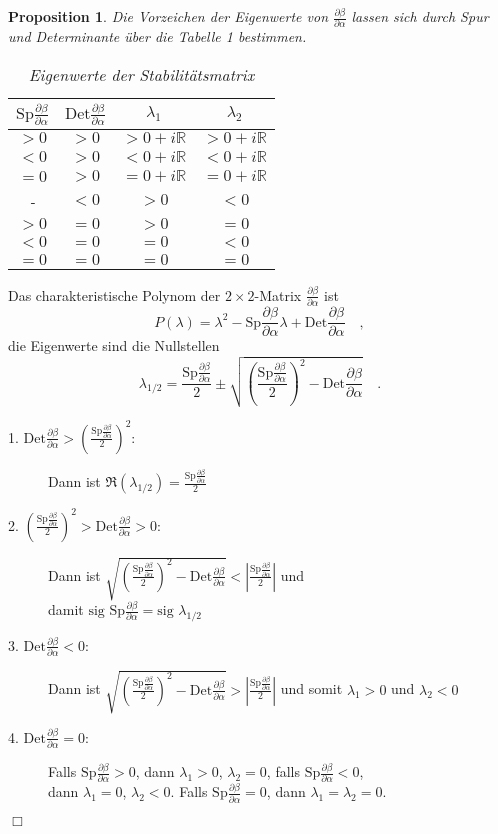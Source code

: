 \documentclass{article}
\newtheorem{proposition}[theorem]{Proposition}
\newenvironment{proof}[1][Beweis]{\begin{trivlist}
\item[\hskip \labelsep {\bfseries #1}]}{\end{trivlist}}
\newcommand{\Sp}{ \text{Sp} \frac{\partial \beta}{\partial \alpha}}
\newcommand{\Det}{ \text{Det} \frac{\partial \beta}{\partial \alpha}}
\begin{document}
	\begin{proposition}
	      Die Vorzeichen der Eigenwerte von $\frac{\partial \beta}{\partial \alpha}$ lassen sich durch Spur und Determinante über die 
	      Tabelle 1 bestimmen.
	      \begin{table}
	      \begin{tabular}{cccc}
	      \toprule
		  $\Sp $ & $\Det $ 	& $\lambda_1$ 	&$ \lambda_2$ \\
		  \midrule 
		  $>0$	& $>0$		&$>0+i\mathbb{R}$		& $>0+i\mathbb{R}$		\\
		  $<0$	& $>0$		&$<0+i\mathbb{R}$		& $<0+i\mathbb{R}$		\\
		  $=0$	& $>0$		&$=0+i\mathbb{R}$		& $=0+i\mathbb{R}$		\\
		  -  	& $<0$		&$>0$		& $<0$		\\
		  $>0$	& $=0$		&$>0$		& $=0$		\\
		  $<0$	& $=0$		&$=0$		& $<0$		\\
		  $=0$	& $=0$		&$=0$		& $=0$		\\
		  \bottomrule
	      \end{tabular}
	      \label{Eigenwerte}\caption{Eigenwerte der Stabilitätsmatrix}
	  \end{table}
	\end{proposition}
	\begin{proof}
	      Das charakteristische Polynom der $2\times 2$-Matrix $\frac{\partial \beta}{\partial \alpha}$ ist
	      \begin{equation}
		P(\lambda)=\lambda^2-\Sp \lambda + \Det \quad ,
	      \end{equation}
	      die Eigenwerte sind die Nullstellen
	      \begin{equation}
		\lambda_{1/2}=\frac{\Sp}{2}\pm \sqrt{\left(\frac{\Sp}{2} \right)^2- \Det} \quad.
	      \end{equation}
		\begin{description}
		  \item[1. $\Det>\left(\frac{\Sp}{2} \right)^2$:] Dann ist $\Re(\lambda_{1/2})= \frac{\Sp}{2}$ 
		  \item[2. $\left(\frac{\Sp}{2} \right)^2>\Det>0$:] Dann ist $\sqrt{\left(\frac{\Sp}{2} \right)^2- \Det}<\left|\frac{\Sp}{2}\right|$ und\\ 
			    damit ${\text{sig } \Sp = \text{sig } \lambda_{1/2}}$
		  \item[3. $\Det<0:$] Dann ist $\sqrt{\left(\frac{\Sp}{2} \right)^2- \Det}>\left|\frac{\Sp}{2}\right|$ und somit
			    $\lambda_1>0$ und $\lambda_2<0$
		  \item[4. $\Det=0$:] Falls $\Sp>0$, dann $\lambda_1>0$, $\lambda_2=0$, falls $\Sp<0$, \\dann $\lambda_1=0$, $\lambda_2<0$. 
			    Falls $\Sp=0$, dann $\lambda_1=\lambda_2=0$.
		\end{description}
	  $\Box$
	\end{proof}
\end{document}
